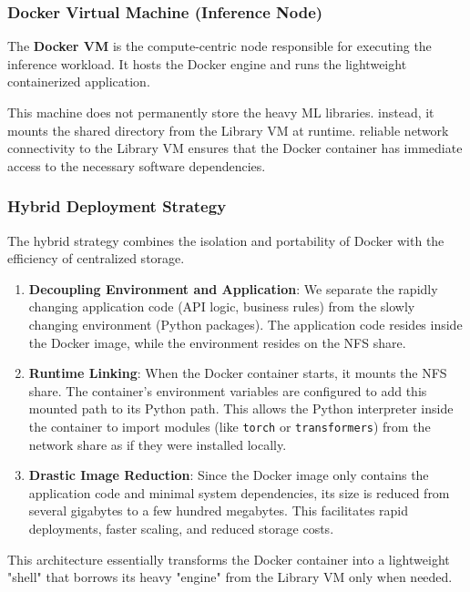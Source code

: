 \documentclass[10pt,a4paper,twocolumn]{article}
\begin{document}
\subsubsection{Docker Virtual Machine (Inference Node)}

The \textbf{Docker VM} is the compute-centric node responsible for executing the inference workload. It hosts the Docker engine and runs the lightweight containerized application.

This machine does not permanently store the heavy ML libraries. instead, it mounts the shared directory from the Library VM at runtime. reliable network connectivity to the Library VM ensures that the Docker container has immediate access to the necessary software dependencies.

\subsubsection{Hybrid Deployment Strategy}

The hybrid strategy combines the isolation and portability of Docker with the efficiency of centralized storage.

\begin{enumerate}
    \item \textbf{Decoupling Environment and Application}: We separate the rapidly changing application code (API logic, business rules) from the slowly changing environment (Python packages). The application code resides inside the Docker image, while the environment resides on the NFS share.
    \item \textbf{Runtime Linking}: When the Docker container starts, it mounts the NFS share. The container's environment variables are configured to add this mounted path to its Python path. This allows the Python interpreter inside the container to import modules (like \texttt{torch} or \texttt{transformers}) from the network share as if they were installed locally.
    \item \textbf{Drastic Image Reduction}: Since the Docker image only contains the application code and minimal system dependencies, its size is reduced from several gigabytes to a few hundred megabytes. This facilitates rapid deployments, faster scaling, and reduced storage costs.
\end{enumerate}

This architecture essentially transforms the Docker container into a lightweight "shell" that borrows its heavy "engine" from the Library VM only when needed.
\end{document}
